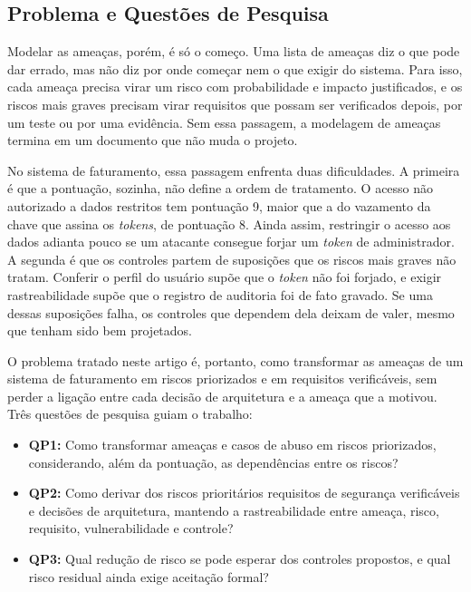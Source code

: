 \documentclass[conference]{IEEEtran}
\begin{document}
\subsection{Problema e Questões de Pesquisa}

Modelar as ameaças, porém, é só o começo. Uma lista de ameaças diz o que pode dar errado, mas não diz por onde começar nem o que exigir do sistema. Para isso, cada ameaça precisa virar um risco com probabilidade e impacto justificados, e os riscos mais graves precisam virar requisitos que possam ser verificados depois, por um teste ou por uma evidência. Sem essa passagem, a modelagem de ameaças termina em um documento que não muda o projeto.

No sistema de faturamento, essa passagem enfrenta duas dificuldades. A primeira é que a pontuação, sozinha, não define a ordem de tratamento. O acesso não autorizado a dados restritos tem pontuação 9, maior que a do vazamento da chave que assina os \textit{tokens}, de pontuação 8. Ainda assim, restringir o acesso aos dados adianta pouco se um atacante consegue forjar um \textit{token} de administrador. A segunda é que os controles partem de suposições que os riscos mais graves não tratam. Conferir o perfil do usuário supõe que o \textit{token} não foi forjado, e exigir rastreabilidade supõe que o registro de auditoria foi de fato gravado. Se uma dessas suposições falha, os controles que dependem dela deixam de valer, mesmo que tenham sido bem projetados.

O problema tratado neste artigo é, portanto, como transformar as ameaças de um sistema de faturamento em riscos priorizados e em requisitos verificáveis, sem perder a ligação entre cada decisão de arquitetura e a ameaça que a motivou. Três questões de pesquisa guiam o trabalho:

\begin{itemize}
    \item \textbf{QP1:} Como transformar ameaças e casos de abuso em riscos priorizados, considerando, além da pontuação, as dependências entre os riscos?
    \item \textbf{QP2:} Como derivar dos riscos prioritários requisitos de segurança verificáveis e decisões de arquitetura, mantendo a rastreabilidade entre ameaça, risco, requisito, vulnerabilidade e controle?
    \item \textbf{QP3:} Qual redução de risco se pode esperar dos controles propostos, e qual risco residual ainda exige aceitação formal?
\end{itemize}
\end{document}
